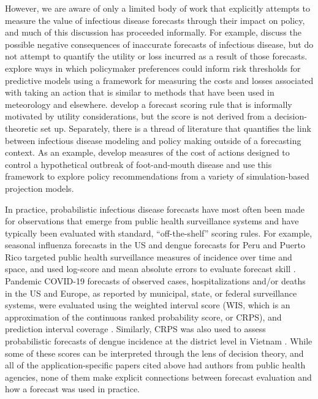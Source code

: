 \documentclass{article}\usepackage[]{graphicx}\usepackage[]{xcolor}
\begin{document}
However, we are aware of only a limited body of work that explicitly attempts to measure the value of infectious disease forecasts through their impact on policy, and much of this discussion has proceeded informally. For example, \cite{ioannidis2022forecastingCOVIDfailed} discuss the possible negative consequences of inaccurate forecasts of infectious disease, but do not attempt to quantify the utility or loss incurred as a result of those forecasts. \cite{bilinski_adaptive_2023} explore ways in which policymaker preferences could inform risk thresholds for predictive models using a framework for measuring the costs and losses associated with taking an action that is similar to methods that have been used in meteorology and elsewhere. \cite{marshall2023predictions} develop a forecast scoring rule that is informally motivated by utility considerations, but the score is not derived from a decision-theoretic set up. Separately, there is a thread of literature that quantifies the link between infectious disease modeling and policy making outside of a forecasting context. As an example, \cite{Probert2016decisionMakingFootMouth} develop measures of the cost of actions designed to control a hypothetical outbreak of foot-and-mouth disease and use this framework to explore policy recommendations from a variety of simulation-based projection models.

In practice, probabilistic infectious disease forecasts have most often been made for observations that emerge from public health surveillance systems and have typically been evaluated with standard, ``off-the-shelf'' scoring rules.
For example, seasonal influenza forecasts in the US and dengue forecasts for Peru and Puerto Rico targeted public health surveillance measures of incidence over time and space, and used log-score and mean absolute errors to evaluate forecast skill \citep{mcgowan_collaborative_2019,reich_collaborative_2019,johansson_open_2019}.
Pandemic COVID-19 forecasts of observed cases, hospitalizations and/or deaths in the US and Europe, as reported by municipal, state, or federal surveillance systems, were evaluated using the weighted interval score (WIS, which is an approximation of the continuous ranked probability score, or CRPS), and prediction interval coverage \citep{cramer_evaluation_2022,fox_real-time_2022,sherratt2023predictive}.
Similarly, CRPS was also used to assess probabilistic forecasts of dengue incidence at the district level in Vietnam \citep{colon-gonzalez_probabilistic_2021}.
While some of these scores can be interpreted through the lens of decision theory, and all of the application-specific papers cited above had authors from public health agencies, none of them make explicit connections between forecast evaluation and how a forecast was used in practice.
\end{document}
